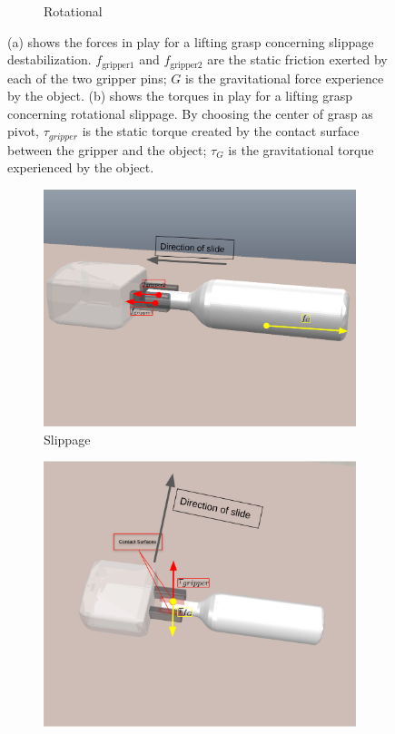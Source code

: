 \documentclass[12pt]{ucsddissertation}
\begin{document}
\begin{figure}
\begin{subfigure}[b]{0.4165\linewidth}
		\caption{Rotational}\label{liftfigb}
	\end{subfigure}%
	\caption[Slippage and rotational destablization illustrations for lifting grasps.]{(a) shows the forces in play for a lifting grasp concerning slippage destabilization. $f_{\mathrm{gripper1}}$ and $f_{\mathrm{gripper2}}$ are the static friction exerted by each of the two gripper pins; $G$ is the gravitational force experience by the object. (b) shows the torques in play for a lifting grasp concerning rotational slippage. By choosing the center of grasp as pivot, $\tau_{gripper}$ is the static torque created by the contact surface between the gripper and the object; $\tau_G$ is the gravitational torque experienced by the object.}
	\label{fig:liftIllustrations}
\end{figure}

\begin{figure}
	\centering
	\begin{subfigure}[b]{0.45\linewidth}
		\includegraphics[width=\linewidth]{figures/slideSlippage.png}
		\caption{Slippage}\label{slidefiga}
	\end{subfigure}%
	\hfill
	\begin{subfigure}[b]{0.407\linewidth}
		\includegraphics[width=\linewidth]{figures/slideRotation.png}

\end{subfigure}
\end{figure}
\end{document}
